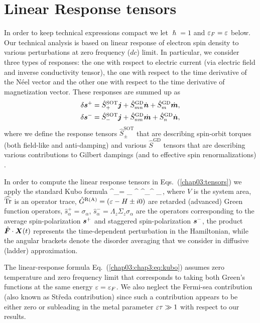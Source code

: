 \section{Linear Response tensors}\label{chap03:sec:appb}
\label{chap03:app:vertexcorrections}
In order to keep technical expressions compact we let $\hslash=1$ and $\varepsilon_F=\varepsilon$ below. Our technical analysis is based on linear response of electron spin density to various perturbations at zero frequency ($dc$) limit. In particular, we consider three types of responses: the one with respect to electric current (via electric field and inverse conductivity tensor), the one with respect to the time derivative of the N\'eel vector 
and the other one with respect to the time derivative of magnetization vector. These responses are summed up as
\beml
\label{chap03:tensors}
\begin{align}
\delta\boldsymbol{s}^+=\hat{S}^\textrm{SOT}_+\boldsymbol{j} +\hat{S}^\textrm{GD}_{mn} \dot{\boldsymbol{n}}+\hat{S}^\textrm{GD}_m\dot{\boldsymbol{m}},\\
\delta\boldsymbol{s}^-=\hat{S}^\textrm{SOT}_-\boldsymbol{j}+\hat{S}^\textrm{GD}_{nm}\dot{\boldsymbol{m}}+\hat{S}^\textrm{GD}_n \dot{\boldsymbol{n}},
\end{align}
\eml
where we define the response tensors $\hat{S}^\textrm{SOT}_\pm$ that are describing spin-orbit torques (both field-like and anti-damping) and various $\hat{S}^\textrm{GD}$ tensors that are describing various contributions to Gilbert dampings (and to effective spin renormalizations) \cite{ado_anisotropy_2019}.

In order to compute the linear response tensors in Eqs.~(\ref{chap03:tensors}) we apply the standard Kubo formula
\be
\label{chap03:chap3:eq:kubo}
\delta{}^\pm_\alpha = 
\s_\beta \widehat{\tr}  \lt\la {}^ ^\pm_\alpha {}^  
_\beta \rt\ra \,,
\e
where $V$ is the system area, $\widehat{\operatorname{Tr}}$ is an operator trace, $\hat{G}^\text{R(A)}=(\varepsilon-H\pm i 0)$ are retarded (advanced) Green function operators, $\hat{s}_\alpha^+ = \sigma_\alpha$, $\hat{s}_\alpha^-=\Lambda_z\Sigma_z\sigma_\alpha$ are the operators corresponding to the average spin-polarization $\boldsymbol{s}^+$ and staggered spin-polarization $\boldsymbol{s}^-$, the product $\hat{\boldsymbol{F}}\cdot \boldsymbol{X}(t)$ represents the time-dependent perturbation in the Hamiltonian, while the angular brackets denote the disorder averaging that we consider in diffusive (ladder) approximation.

The linear-response formula Eq.~(\ref{chap03:chap3:eq:kubo}) assumes zero temperature and zero frequency limit that corresponds to taking both Green's functions at the same energy $\varepsilon=\varepsilon_F$. We also neglect the Fermi-sea contribution (also known as St\v{r}eda contribution) since such a contribution appears to be either zero or subleading in the metal parameter $\varepsilon\tau\gg 1$ with respect to our results.  
 

